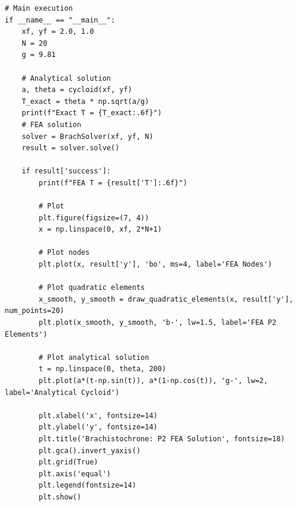 \documentclass[11pt]{article}
\begin{document}
\begin{verbatim}
# Main execution
if __name__ == "__main__":
    xf, yf = 2.0, 1.0 
    N = 20
    g = 9.81

    # Analytical solution
    a, theta = cycloid(xf, yf) 
    T_exact = theta * np.sqrt(a/g) 
    print(f"Exact T = {T_exact:.6f}") 
    # FEA solution
    solver = BrachSolver(xf, yf, N)
    result = solver.solve()

    if result['success']:
        print(f"FEA T = {result['T']:.6f}")

        # Plot
        plt.figure(figsize=(7, 4))
        x = np.linspace(0, xf, 2*N+1)

        # Plot nodes
        plt.plot(x, result['y'], 'bo', ms=4, label='FEA Nodes')

        # Plot quadratic elements
        x_smooth, y_smooth = draw_quadratic_elements(x, result['y'], num_points=20)
        plt.plot(x_smooth, y_smooth, 'b-', lw=1.5, label='FEA P2 Elements')

        # Plot analytical solution
        t = np.linspace(0, theta, 200)
        plt.plot(a*(t-np.sin(t)), a*(1-np.cos(t)), 'g-', lw=2, label='Analytical Cycloid')

        plt.xlabel('x', fontsize=14) 
        plt.ylabel('y', fontsize=14) 
        plt.title('Brachistochrone: P2 FEA Solution', fontsize=18)
        plt.gca().invert_yaxis()
        plt.grid(True)
        plt.axis('equal')
        plt.legend(fontsize=14)  
        plt.show()

\end{verbatim}
\end{document}
